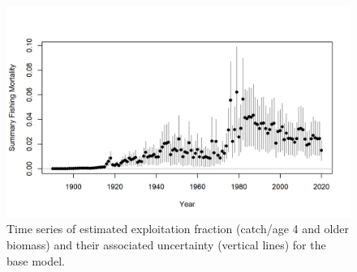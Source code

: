 \documentclass[11pt,
  english,
  a4paper,
]{article}
\begin{document}
\tagmcend\tagstructend


\begin{figure}
\centering
\includegraphics[width=1\textwidth,height=1\textheight]{figs/ts_summaryF.png}
\caption{Time series of estimated exploitation fraction (catch/age 4 and older biomass) and their associated uncertainty (vertical lines) for the base model.\label{fig:ts_summaryF}}
\end{figure}

\tagmcend\tagstructend

\end{document}

